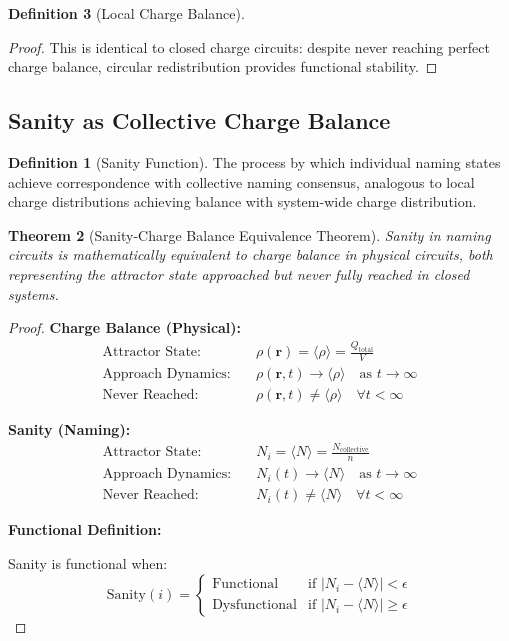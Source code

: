\documentclass[12pt,a4paper]{article}
\theoremstyle{plain}
\newtheorem{theorem}{Theorem}[section]
\theoremstyle{definition}
\newtheorem{definition}[theorem]{Definition}
\theoremstyle{remark}
\begin{document}
\begin{definition}[Local Charge Balance]
\begin{proof}
This is identical to closed charge circuits: despite never reaching perfect charge balance, circular redistribution provides functional stability.
\end{proof}

\subsection{Sanity as Collective Charge Balance}

\begin{definition}[Sanity Function]
The process by which individual naming states achieve correspondence with collective naming consensus, analogous to local charge distributions achieving balance with system-wide charge distribution.
\end{definition}

\begin{theorem}[Sanity-Charge Balance Equivalence Theorem]
Sanity in naming circuits is mathematically equivalent to charge balance in physical circuits, both representing the attractor state approached but never fully reached in closed systems.
\end{theorem}

\begin{proof}
\textbf{Charge Balance (Physical):}
\begin{align}
\text{Attractor State:} &\quad \rho(\mathbf{r}) = \langle \rho \rangle = \frac{Q_{\text{total}}}{V} \\
\text{Approach Dynamics:} &\quad \rho(\mathbf{r},t) \rightarrow \langle \rho \rangle \quad \text{as } t \rightarrow \infty \\
\text{Never Reached:} &\quad \rho(\mathbf{r},t) \neq \langle \rho \rangle \quad \forall t < \infty
\end{align}

\textbf{Sanity (Naming):}
\begin{align}
\text{Attractor State:} &\quad N_i = \langle N \rangle = \frac{N_{\text{collective}}}{n} \\
\text{Approach Dynamics:} &\quad N_i(t) \rightarrow \langle N \rangle \quad \text{as } t \rightarrow \infty \\
\text{Never Reached:} &\quad N_i(t) \neq \langle N \rangle \quad \forall t < \infty
\end{align}

\textbf{Functional Definition:}

Sanity is functional when:
\begin{equation}
\text{Sanity}(i) = \begin{cases}
\text{Functional} & \text{if } |N_i - \langle N \rangle| < \epsilon \\
\text{Dysfunctional} & \text{if } |N_i - \langle N \rangle| \geq \epsilon
\end{cases}
\end{equation}


\end{proof}
\end{definition}
\end{document}
